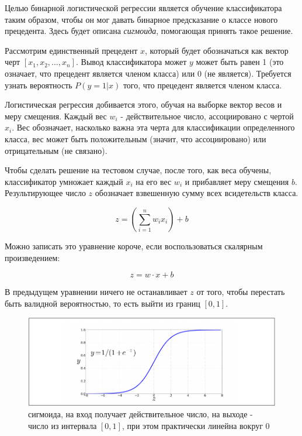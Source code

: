 \documentclass[a4paper,12pt,preview]{report} %
\begin{document}
	Целью бинарной логистической регрессии является обучение классификатора таким образом, чтобы он мог давать бинарное предсказание о классе нового прецедента. Здесь будет описана \textit{сигмоида}, помогающая принять такое решение.
	
	Рассмотрим единственный прецедент $x$, который будет обозначаться как вектор черт $[x_1, x_2, \dots, x_n]$. Вывод классификатора может $y$ может быть равен 1 (это означает, что прецедент является членом класса) или 0 (не является). Требуется узнать вероятность $P(y = 1 | x)$ того, что прецедент является членом класса.
	
	Логистическая регрессия добивается этого, обучая на выборке вектор весов и меру смещения. Каждый вес $w_i$ - действительное число, ассоциировано с чертой $x_i$. Вес обозначает, насколько важна эта черта для классификации определенного класса, вес может быть положительным (значит, что ассоциировано) или отрицательным (не связано). 
	
	Чтобы сделать решение на тестовом случае, после того, как веса обучены, классификатор умножает каждый $x_i$ на его вес $w_i$ и прибавляет меру смещения $b$. Результирующее число $z$ обозначает взвешенную сумму всех всидетельств класса.
	
	\begin{equation}
	z = (\sum_{i=1}^n w_i x_i) + b
	\end{equation}
	
	Можно записать это уравнение короче, если воспользоваться скалярным произведением:
	
	\begin{equation}
	z = w \cdot x + b
	\end{equation}
	
	
	В предыдущем уравнении ничего не останавливает $z$ от того, чтобы перестать быть валидной вероятностью, то есть выйти из границ $[0, 1]$.  
	
	\begin{figure}[H]
		\centering\includegraphics[scale=0.8]{sigmoid.PNG}
		\caption{сигмоида, на вход получает действительное число, на выходе - число из интервала $[0, 1]$, при этом практически линейна вокруг 0}
		\label{fig:sigmoid}
	\end{figure}
	
\end{document}
